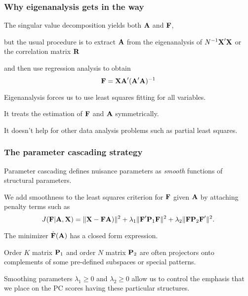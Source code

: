 \documentclass[11pt]{beamer}
\begin{document}

\begin{frame}

\frametitle{Why eigenanalysis gets in the way}

\bi
  \item The singular value decomposition yields both $\mbox{\bf A}$ and $\mbox{\bf F}$,
  \item but the usual procedure is to extract $\mbox{\bf A}$ from the eigenanalysis of $N^{-1} \mbox{\bf X}' \mbox{\bf X}$
  or the correlation matrix $\mbox{\bf R}$
  \item and then use regression analysis to obtain
  \[
    \mbox{\bf F} = \mbox{\bf X} \mbox{\bf A}' (\mbox{\bf A}' \mbox{\bf A})^{-1}
  \]
  \item Eigenanalysis forces us to use least squares fitting for all variables.
  \item It treats the estimation of $\mbox{\bf F}$ and $\mbox{\bf A}$ symmetrically.
  \item It doesn't help for other data analysis problems such as partial least squares.
\ei

\end{frame}


\begin{frame}

\frametitle{The parameter cascading strategy}

\bi
  \item Parameter cascading defines nuisance parameters as \emph{smooth} functions of
  structural parameters.
  \item We add smoothness to the least squares criterion for $\mbox{\bf F}$ given $\mbox{\bf A}$ by attaching penalty terms such as
  \[
    J(\mbox{\bf F}|\mbox{\bf A},\mbox{\bf X}) = \| \mbox{\bf X} - \mbox{\bf F} \mbox{\bf A}) \|^2 +
              \lambda_1 \| \mbox{\bf F}' \mbox{\bf P}_1 \mbox{\bf F} \|^2 + \lambda_2 \| \mbox{\bf F}  \mbox{\bf P}_2 \mbox{\bf F}' \|^2.
  \]
  \item The minimizer $\hat{\mbox{\bf F}}(\mbox{\bf A})$ has a closed form expression.
  \item Order $K$ matrix $\mbox{\bf P}_1$ and order $N$ matrix $\mbox{\bf P}_2$ are often projectors onto complements of some pre-defined subspaces or special patterns.
  \item Smoothing parameters $\lambda_1 \geq 0$ and $\lambda_2 \geq 0$ allow us to control the emphasis that we place on the PC scores having these particular structures.
\ei

\end{frame}
\end{document}
